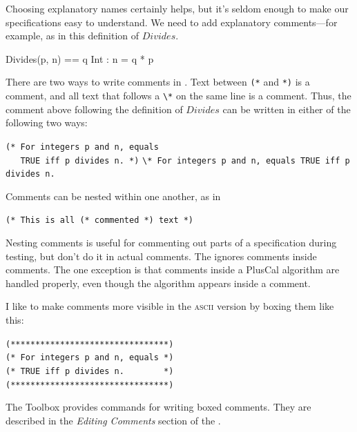 \documentclass[fleqn,leqno]{article}
\begin{document}
Choosing explanatory names certainly helps, but it's seldom
enough to make our specifications easy to understand.  We need to add
explanatory comments---for example, as in this definition
of $Divides$.
\begin{display}
\begin{notla}
Divides(p, n) == \E q \in Int : n = q * p
\end{notla}
\begin{tlatex}
\end{tlatex}
\par
\mbox{}
\end{display}
There are two ways to write comments in \tlaplus.  Text between
\verb|(*| and \verb|*)| is a comment, and all text that follows a
\verb|\*| on the same line is a comment.  Thus, the comment above
following the definition of $Divides$ can be written in either of
the following two ways:
\begin{display}
\verb|(* For integers p and n, equals   |\\
\verb|   TRUE iff p divides n. *)| 
\verb|\* For integers p and n, equals TRUE iff p divides n.|
\end{display}
Comments can be nested within one another, as in
\begin{display}
\verb|(* This is all (* commented *) text *)|
\end{display}
Nesting comments is useful for commenting out parts of a specification
during testing, but don't do it in actual comments.  The
 ignores comments inside
comments.  The one exception is that comments inside a PlusCal
algorithm are handled properly, even though the algorithm appears
inside a comment.

I like to make comments more visible in the \textsc{ascii} version
by 
boxing them like this:
\begin{display}
\verb|(********************************)|\\
\verb|(* For integers p and n, equals *)|\\
\verb|(* TRUE iff p divides n.        *)|\\
\verb|(********************************)|
\end{display}
The Toolbox provides commands for writing boxed comments.  They are
described in the \emph{Editing Comments} section of the
.
\end{document}
